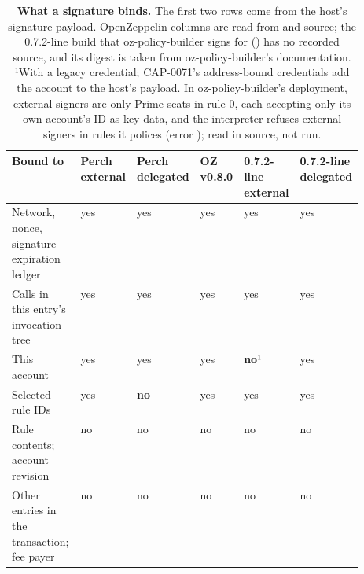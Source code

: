 \begin{table}[tbp]
\centering
\caption{\textbf{What a signature binds.} The first two rows come from the host's signature payload. OpenZeppelin columns are read from   and  source; the 0.7.2-line build that oz-policy-builder signs for () has no recorded source, and its digest is taken from oz-policy-builder's documentation. ¹With a legacy  credential; CAP-0071's address-bound credentials add the account to the host's payload. In oz-policy-builder's deployment, external signers are only Prime seats in rule 0, each accepting only its own account's ID as key data, and the interpreter refuses external signers in rules it polices (error ); read in source, not run.}\label{tab:tab-binding}
\scriptsize\begin{tabularx}{\linewidth}{@{}L*{5}{>{\centering\arraybackslash}p{0.105\linewidth}}@{}}
\toprule
\textbf{Bound to} & \textbf{Perch external} & \textbf{Perch delegated} & \textbf{OZ v0.8.0} & \textbf{0.7.2-line external} & \textbf{0.7.2-line delegated} \\
\midrule
Network, nonce, signature-expiration ledger & yes & yes & yes & yes & yes \\
Calls in this entry's invocation tree & yes & yes & yes & yes & yes \\
This account & yes & yes & yes & \textbf{no}¹ & yes \\
Selected rule IDs & yes & \textbf{no} & yes & yes & yes \\
Rule contents; account revision & no & no & no & no & no \\
Other entries in the transaction; fee payer & no & no & no & no & no \\
\bottomrule
\end{tabularx}
\end{table}
